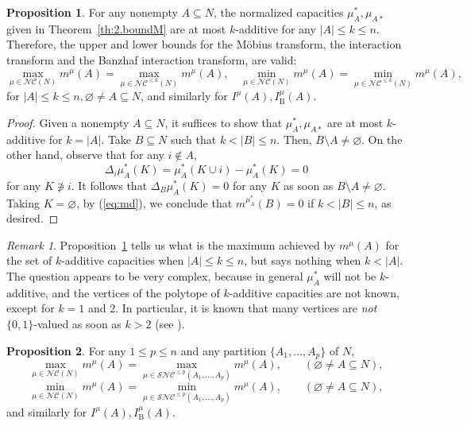 \documentclass[12pt,a4paper]{article}
\theoremstyle{definition}
\newtheorem{proposition}{Proposition}
\theoremstyle{remark}
\newtheorem{remark}{Remark}
\def \NC {\mathscr{NC}}
\def \SNC {\mathscr{SNC}}
\begin{document}
\begin{proposition}\label{prop:1}
For any nonempty $A\subseteq N$, the normalized capacities $\mu^*_A,\mu_{A*}$
given in Theorem~\ref{th:2.boundM} are at most $k$-additive for any
$|A|\leqslant k\leqslant n$. Therefore, the upper and lower bounds for the
M\"obius transform, the interaction transform and the Banzhaf interaction
transform, are valid:
\[
\max_{\mu\in\NC(N)}m^\mu(A) = \max_{\mu\in\NC^{\leqslant k}(N)}m^\mu(A),\quad
\min_{\mu\in\NC(N)}m^\mu(A) = \min_{\mu\in\NC^{\leqslant k}(N)}m^\mu(A),
\]
for $|A|\leqslant k\leqslant n,\varnothing\neq A\subseteq N$,
and similarly for $I^\mu(A),I^\mu_\mathrm{B}(A)$.
\end{proposition}
\begin{proof}
Given a nonempty $A\subseteq N$, it suffices to show that $ \mu_A^{*}, \mu_{A*}$ are at
most $k$-additive for $k=|A|$. Take $B\subseteq N$ such that $k<|B|\leqslant n.$
Then, $B\setminus A\neq\varnothing$. On the other hand, observe that for
  any $i\not\in A$, 
\[
\Delta_i\mu^*_A(K)= \mu^*_A(K\cup i) -\mu^*_A(K)=0
\]
for any $K\not\ni i$. It follows that $\Delta_B\mu^*_A(K)=0$ for any $K$ as soon as
$B\setminus A\neq\varnothing$. Taking $K=\varnothing$, by (\ref{eq:md}), we conclude that
$m^{\mu^*_A}(B) = 0$ if $k<|B|\leqslant n$, as desired.
\end{proof}
 \begin{remark} Proposition~\ref{prop:1} tells us what is the maximum
    achieved by $m^\mu(A)$ for the set of $k$-additive capacities when
    $|A|\leqslant k\leqslant n$, but says nothing when $k<|A|$. The question
    appears to be very complex, because in general $\mu^*_A$ will not be
    $k$-additive, and the vertices of the polytope of $k$-additive capacities
    are not known, except for $k=1$ and 2. In particular, it is known that many
    vertices are \textit{not} $\{0,1\}$-valued as soon as $k>2$ (see
    \cite{micogi06}).
\end{remark}
\begin{proposition}
For any $1\leqslant p\leqslant n$ and any partition $\{ A_1,\ldots, A_p\} $ of $N$,
\[
\max_{\mu\in\NC(N)}m^\mu(A) = \max_{\mu\in \SNC^{\leqslant p}(A_1,\ldots, A_p)}m^\mu(A), \qquad
(\varnothing\neq A\subseteq N), \]
\[ \min_{\mu\in\NC(N)}m^\mu(A) = \min_{\mu\in \SNC^{\leqslant p}(A_1,\ldots, A_p)}m^\mu(A), \qquad
(\varnothing\neq A\subseteq N),
\]
and similarly for $I^\mu(A),I^\mu_\mathrm{B}(A)$.
\end{proposition}
\end{document}
